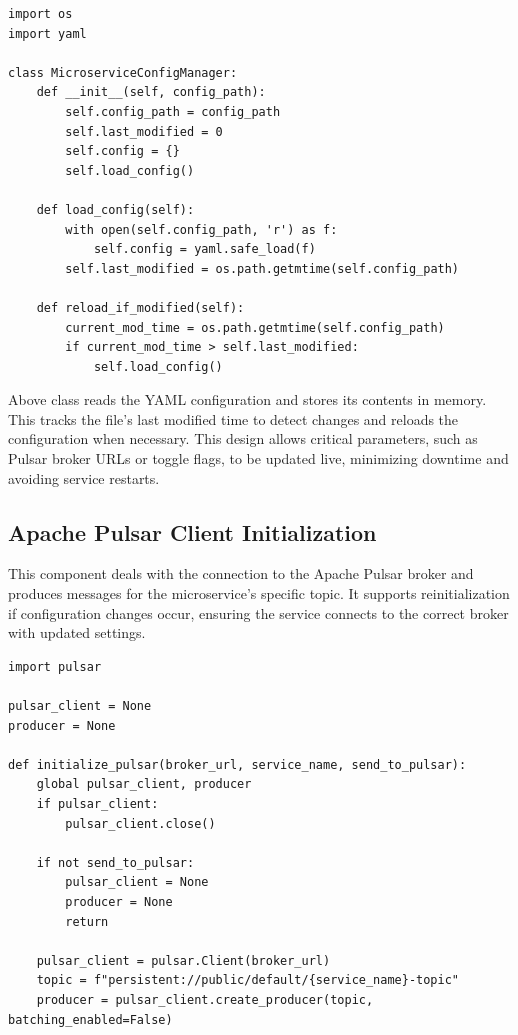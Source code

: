 \begin{lstlisting}[breaklines=true,basicstyle=\small\ttfamily,frame=single]
import os
import yaml

class MicroserviceConfigManager:
    def __init__(self, config_path):
        self.config_path = config_path
        self.last_modified = 0
        self.config = {}
        self.load_config()

    def load_config(self):
        with open(self.config_path, 'r') as f:
            self.config = yaml.safe_load(f)
        self.last_modified = os.path.getmtime(self.config_path)

    def reload_if_modified(self):
        current_mod_time = os.path.getmtime(self.config_path)
        if current_mod_time > self.last_modified:
            self.load_config()
\end{lstlisting}

Above class reads the YAML configuration and stores its contents in memory. This tracks the file’s last modified time to detect changes and reloads the configuration when necessary. This design allows critical parameters, such as Pulsar broker URLs or toggle flags, to be updated live, minimizing downtime and avoiding service restarts.

\subsection{Apache Pulsar Client Initialization}
This component deals with the connection to the Apache Pulsar broker and produces messages for the microservice’s specific topic. It supports reinitialization if configuration changes occur, ensuring the service connects to the correct broker with updated settings.

\begin{lstlisting}[breaklines=true,basicstyle=\small\ttfamily,frame=single]
import pulsar

pulsar_client = None
producer = None

def initialize_pulsar(broker_url, service_name, send_to_pulsar):
    global pulsar_client, producer
    if pulsar_client:
        pulsar_client.close()

    if not send_to_pulsar:
        pulsar_client = None
        producer = None
        return

    pulsar_client = pulsar.Client(broker_url)
    topic = f"persistent://public/default/{service_name}-topic"
    producer = pulsar_client.create_producer(topic, batching_enabled=False)
\end{lstlisting}

